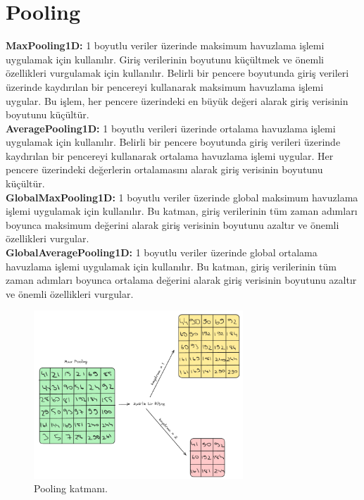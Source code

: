 \section{Pooling}
\textbf{MaxPooling1D:} 1 boyutlu veriler üzerinde maksimum havuzlama işlemi uygulamak için kullanılır. Giriş verilerinin boyutunu küçültmek ve önemli özellikleri vurgulamak için kullanılır. Belirli bir pencere boyutunda giriş verileri üzerinde kaydırılan bir pencereyi kullanarak maksimum havuzlama işlemi uygular. Bu işlem, her pencere üzerindeki en büyük değeri alarak giriş verisinin boyutunu küçültür.\\
\textbf{AveragePooling1D:} 1 boyutlu verileri üzerinde ortalama havuzlama işlemi uygulamak için kullanılır. Belirli bir pencere boyutunda giriş verileri üzerinde kaydırılan bir pencereyi kullanarak ortalama havuzlama işlemi uygular. Her pencere üzerindeki değerlerin ortalamasını alarak giriş verisinin boyutunu küçültür.\\
\textbf{GlobalMaxPooling1D:} 1 boyutlu veriler üzerinde global maksimum havuzlama işlemi uygulamak için kullanılır. Bu katman, giriş verilerinin tüm zaman adımları boyunca maksimum değerini alarak giriş verisinin boyutunu azaltır ve önemli özellikleri vurgular.\\
\textbf{GlobalAveragePooling1D:} 1 boyutlu veriler üzerinde global ortalama havuzlama işlemi uygulamak için kullanılır. Bu katman, giriş verilerinin tüm zaman adımları boyunca ortalama değerini alarak giriş verisinin boyutunu azaltır ve önemli özellikleri vurgular.

\begin{figure}[h]
    \centering
    \includegraphics[width=0.7\textwidth]{images/pooling_layer.png}
    \caption{Pooling katmanı.}
    \label{fig:enter-label}
\end{figure}

\newpage